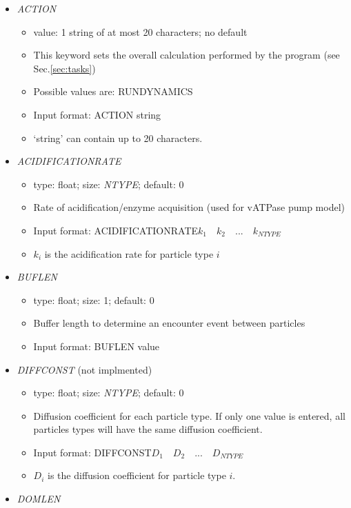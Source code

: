 \documentclass[12pt]{article}
\begin{document}
\begin{itemize}
%
\item {\it ACTION}
  \begin{itemize}
    \item  value: 1 string of at most 20 characters; no default
    \item This keyword sets the overall calculation performed by the program (see Sec.\ref{sec:tasks})
    \item Possible values are: RUNDYNAMICS
    \item Input format: ACTION string
    \item `string' can contain up to 20 characters.
  \end{itemize}
%
\item {\it ACIDIFICATIONRATE}
\begin{itemize}
	\item  type: float; size: \textit{NTYPE}; default: 0
	\item Rate of acidification/enzyme acquisition (used for vATPase pump model)
	\item Input format: ACIDIFICATIONRATE\quad$k_{1}\quad k_{2}\quad...\quad k_{NTYPE}$
	\item $k_i$ is the acidification rate for particle type $i$
\end{itemize}
%
\item {\it BUFLEN}
  \begin{itemize}
    \item  type: float; size: 1; default: 0
    \item Buffer length to determine an encounter event between particles
    \item Input format: BUFLEN value
  \end{itemize}
%
\item {\it DIFFCONST} (not implmented)
  \begin{itemize}
    \item  type: float; size: \textit{NTYPE}; default: 0
    \item Diffusion coefficient for each particle type. If only one value is entered, all particles types will have the same diffusion coefficient.
    \item Input format: DIFFCONST\quad$D_{1}\quad D_{2}\quad...\quad D_{NTYPE}$
    \item $D_{i}$ is the diffusion coefficient for particle type $i$.
  \end{itemize}
%
\item {\it DOMLEN}
	\begin{itemize}

\end{itemize}
\end{itemize}
\end{document}

